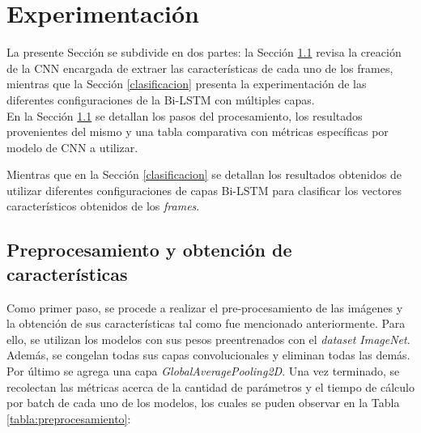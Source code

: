 \section{Experimentación} \label{experimentacion}

La presente Sección se subdivide en dos partes: la Sección \ref{procesamiento} 
revisa la creación de la CNN encargada de extraer las características de cada uno 
de los frames, mientras que la Sección \ref{clasificacion} presenta la 
experimentación de las diferentes configuraciones de la Bi-LSTM con múltiples 
capas.\\

En la Sección \ref{procesamiento} se detallan los pasos del 
procesamiento, los resultados provenientes del mismo y una tabla 
comparativa con métricas específicas por modelo de CNN a utilizar. 

Mientras que en la Sección \ref{clasificacion} se detallan los 
resultados obtenidos de utilizar diferentes configuraciones de capas 
Bi-LSTM para clasificar los vectores característicos obtenidos de los 
\textit{frames}. 


\subsection{Preprocesamiento y obtención de características}\label{procesamiento}

Como primer paso, se procede a realizar el pre-procesamiento 
de las imágenes y la obtención de sus características tal 
como fue mencionado anteriormente. Para ello, se utilizan los modelos 
con sus pesos preentrenados con el \textit{dataset ImageNet}. Además, se 
congelan todas sus capas convolucionales y eliminan todas las demás. Por último 
se agrega una capa \textit{GlobalAveragePooling2D}. Una vez terminado, 
se recolectan las métricas acerca de la cantidad de parámetros y el 
tiempo de cálculo por batch de cada uno de los modelos, los cuales 
se puden observar en la Tabla \ref{tabla:preprocesamiento}:

